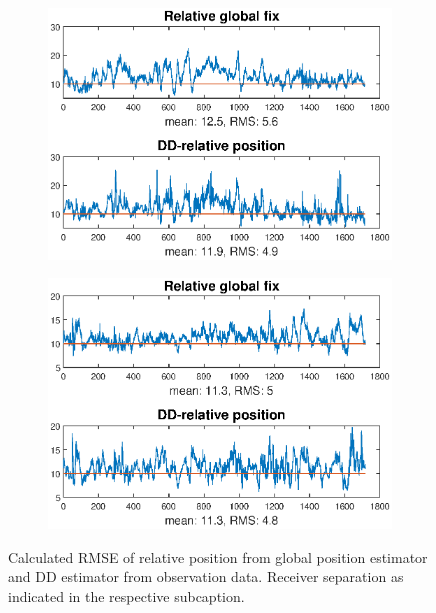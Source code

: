 \begin{figure}[!htb]
\centering
\begin{subfigure}{\textwidth}
\includegraphics[width=\textwidth]{Results/MSEplots/Nobs.eps}
\end{subfigure}
\begin{subfigure}{\textwidth}
\includegraphics[width=\textwidth]{Results/MSEplots/Eobs.eps}
\end{subfigure}
\caption{Calculated RMSE of relative position from global position estimator and DD estimator from observation data. Receiver separation as indicated in the respective subcaption.}
\end{figure}

